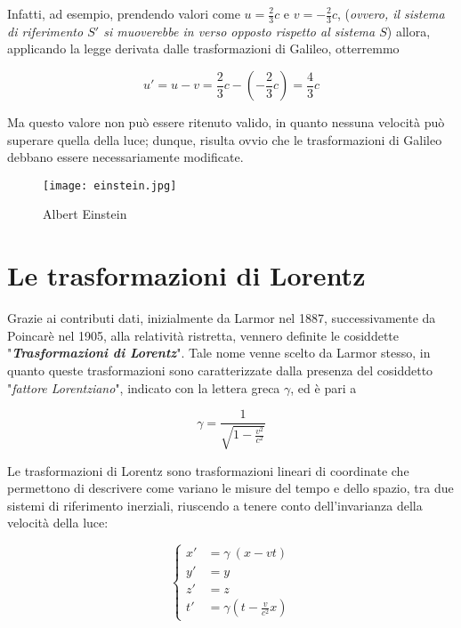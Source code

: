 \documentclass{article}
\begin{document}
Infatti, ad esempio, prendendo valori come \(u = \frac{2}{3}c\) e \(v = - \frac{2}{3}c\),
(\textit{ovvero, il sistema di riferimento \(S'\) si muoverebbe in verso opposto rispetto
al sistema \(S\)}) allora, applicando la legge derivata dalle trasformazioni
di Galileo, otterremmo

\begin{equation}
    u' = u - v = \frac{2}{3}c - (- \frac{2}{3}c) = \frac{4}{3}c
\end{equation}

Ma questo valore non può essere ritenuto valido, in quanto nessuna
velocità può superare quella della luce; dunque, risulta ovvio che le
trasformazioni di Galileo debbano essere necessariamente modificate.

\begin{figure}[htbp]
    \label{einstein}
    \centerline{\texttt{[image: einstein.jpg]}}
    \caption{Albert Einstein}
\end{figure}

\section{Le trasformazioni di Lorentz}
Grazie ai contributi dati, inizialmente da Larmor nel 1887, successivamente
da Poincarè nel 1905, alla relatività ristretta, vennero definite le
cosiddette "\textbf{\textit{Trasformazioni di Lorentz}}". Tale nome venne
scelto da Larmor stesso, in quanto queste trasformazioni sono caratterizzate
dalla presenza del cosiddetto "\textit{fattore Lorentziano}", indicato con
la lettera greca \(\gamma\), ed è pari a

\begin{equation}
    \label{gamma}
    \gamma = \frac{1}{\sqrt{1 - \frac{v^2}{c^2}}} 
\end{equation}

Le trasformazioni di Lorentz sono trasformazioni lineari di coordinate
che permettono di descrivere come variano le misure del tempo e dello spazio,
tra due sistemi di riferimento inerziali, riuscendo a tenere conto
dell'invarianza della velocità della luce:

\begin{equation}
    \left\{
        \begin{aligned}
        x' &= \gamma\ (x - vt) \\
        y' &= y \\
        z' &= z \\
        t' &= \gamma \left(t - \frac{v}{c^2} x\right)
        \end{aligned}
    \right.
\end{equation}
\end{document}
